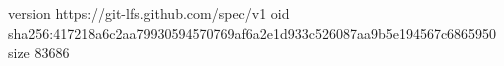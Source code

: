 version https://git-lfs.github.com/spec/v1
oid sha256:417218a6c2aa79930594570769af6a2e1d933c526087aa9b5e194567c6865950
size 83686
